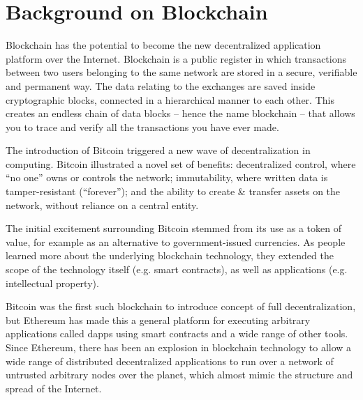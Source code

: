 \section{Background on Blockchain}\label{sec:blockchain}

Blockchain has the potential to become the new decentralized application platform over the Internet. Blockchain is a
public register in which transactions between two users belonging to the same network are stored in a secure, verifiable
and permanent way. The data relating to the exchanges are saved inside cryptographic blocks, connected in a hierarchical
manner to each other. This creates an endless chain of data blocks -- hence the name blockchain -- that allows you to
trace and verify all the transactions you have ever made.

The introduction of Bitcoin \cite{nakamoto2009bitcoin} triggered a new wave of decentralization in computing.
Bitcoin illustrated a novel set of benefits: decentralized control, where ``no one'' owns or controls the network;
immutability, where written data is tamper-resistant (``forever''); and the ability to create \& transfer assets on the
network, without reliance on a central entity.

The initial excitement surrounding Bitcoin stemmed from its use as a token of value, for example as an alternative to
government-issued currencies.  As people learned more about the underlying blockchain technology, they extended the
scope of the technology itself (e.g. smart contracts), as well as applications (e.g. intellectual property).

Bitcoin was the first such blockchain to introduce concept of full decentralization, but Ethereum has made this a
general platform for executing arbitrary applications called dapps using smart contracts and a wide range of other
tools. Since Ethereum, there has been an explosion in blockchain technology to allow a wide range of distributed
decentralized applications to run over a network of untrusted arbitrary nodes over the planet, which almost mimic the
structure and spread of the Internet.


